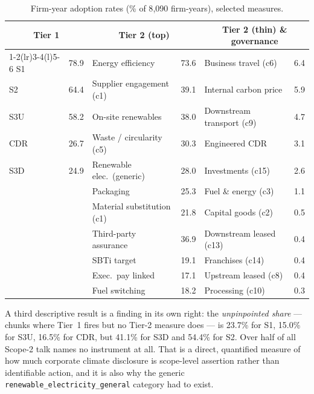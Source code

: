 \documentclass[11pt]{article}
\newcommand{\code}[1]{\texttt{\small #1}}
\begin{document}
\begin{table}[t]
\centering
\small
\caption{Firm-year adoption rates (\% of 8{,}090 firm-years), selected measures.}
\label{tab:adopt}
\begin{tabular}{@{}lr lr lr@{}}
\toprule
\multicolumn{2}{c}{\textbf{Tier 1}} & \multicolumn{2}{c}{\textbf{Tier 2 (top)}} & \multicolumn{2}{c}{\textbf{Tier 2 (thin) \& governance}} \\
\cmidrule(r){1-2}\cmidrule(lr){3-4}\cmidrule(l){5-6}
S1  & 78.9 & Energy efficiency        & 73.6 & Business travel (c6)    & 6.4 \\
S2  & 64.4 & Supplier engagement (c1) & 39.1 & Internal carbon price   & 5.9 \\
S3U & 58.2 & On-site renewables       & 38.0 & Downstream transport (c9) & 4.7 \\
CDR & 26.7 & Waste / circularity (c5) & 30.3 & Engineered CDR          & 3.1 \\
S3D & 24.9 & Renewable elec.\ (generic) & 28.0 & Investments (c15)     & 2.6 \\
    &      & Packaging                & 25.3 & Fuel \& energy (c3)     & 1.1 \\
    &      & Material substitution (c1) & 21.8 & Capital goods (c2)    & 0.5 \\
    &      & Third-party assurance    & 36.9 & Downstream leased (c13) & 0.4 \\
    &      & SBTi target              & 19.1 & Franchises (c14)        & 0.4 \\
    &      & Exec.\ pay linked        & 17.1 & Upstream leased (c8)    & 0.4 \\
    &      & Fuel switching           & 18.2 & Processing (c10)        & 0.3 \\
\bottomrule
\end{tabular}
\end{table}

A third descriptive result is a finding in its own right: the
\emph{unpinpointed share} --- chunks where Tier~1 fires but no Tier-2 measure
does --- is 23.7\% for S1, 15.0\% for S3U, 16.5\% for CDR, but 41.1\% for S3D
and 54.4\% for S2. Over half of all Scope-2 talk names no instrument at all.
That is a direct, quantified measure of how much corporate climate disclosure
is scope-level assertion rather than identifiable action, and it is also why
the generic \code{renewable\_electricity\_general} category had to exist.

\end{document}
